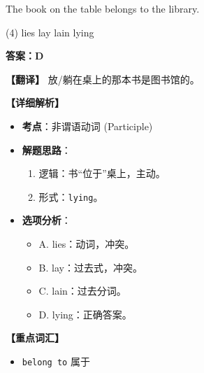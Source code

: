 \documentclass[11pt, a4paper]{article}
\newcommand{\analysis}[4]{
    \begin{solutionbox}
        \textbf{答案：#1}
        
        \textbf{【翻译】} #2
        
        \textbf{【详细解析】}
        #3
        
        \textbf{【重点词汇】}
        #4
    \end{solutionbox}
}
\newcommand{\blank}{\underline{\hspace{1.5cm}}}
\begin{document}
\begin{questions}
    \item The book \blank on the table belongs to the library.
    \begin{tasks}(4)
        \task lies \task lay \task lain \task lying
    \end{tasks}
    \analysis{D}{放/躺在桌上的那本书是图书馆的。}{
        \begin{itemize}
            \item \textbf{考点}：非谓语动词 (Participle)
            \item \textbf{解题思路}：
                \begin{enumerate}
                    \item 逻辑：书“位于”桌上，主动。
                    \item 形式：\texttt{lying}。
                \end{enumerate}
            \item \textbf{选项分析}：
                \begin{itemize}
                    \item A. lies：动词，冲突。
                    \item B. lay：过去式，冲突。
                    \item C. lain：过去分词。
                    \item D. lying：正确答案。
                \end{itemize}
        \end{itemize}
    }{
        \begin{itemize}
            \item \texttt{belong to} 属于
        \end{itemize}
    }


\end{questions}
\end{document}
